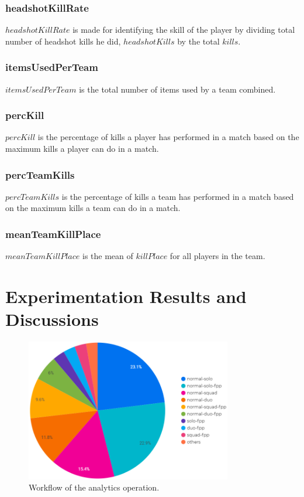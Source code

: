 \documentclass[journal,twoside,web]{ieeecolor}
\begin{document}
\subsubsection{headshotKillRate}
$headshotKillRate$ is made for identifying the skill of the player by dividing total number of headshot kills he did, $headshotKills$ by the total $kills$.

\subsubsection{itemsUsedPerTeam}
$itemsUsedPerTeam$ is the total number of items used by a team combined.

\subsubsection{percKill}
$percKill$ is the percentage of kills a player has performed in a match based on the maximum kills a player can do in a match.

\subsubsection{percTeamKills}
$percTeamKills$ is the percentage of kills a team has performed in a match based on the maximum kills a team can do in a match.

\subsubsection{meanTeamKillPlace}
$meanTeamKillPlace$ is the mean of $killPlace$ for all players in the team.

\section{Experimentation Results and Discussions}
\label{sec:discussion}

\begin{figure}[h]
    \includegraphics[width=9cm]{images/match_type_vs_kills.png}
    \caption{Workflow of the analytics operation.}
    \label{fig:2}
\end{figure}
\end{document}
